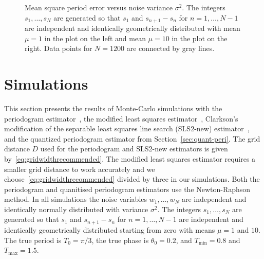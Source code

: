 \documentclass[10pt,twocolumn,twoside]{IEEEtran}
\begin{document}
\begin{figure*}[t]
  \caption{Mean square period error versus noise variance $\sigma^2$.  The integers $s_1,\dots,s_N$ are generated so that $s_1$ and $s_{n+1} - s_n$ for $n=1,\dots,N-1$ are independent and identically geometrically distributed with mean $\mu = 1$ in the plot on the left and mean $\mu=10$ in the plot on the right. Data points for $N=1200$ are connected by gray lines.}\label{plot:multipleN}
\end{figure*} 


\section{Simulations} \label{sec:simulations}

This section presents the results of Monte-Carlo simulations with the periodogram estimator~\cite{Haohuan2013435,Fogel1989_bit_synch_zero_crossings}, the modified least squares estimator~\cite{Clarkson2007,McKilliam2007,Quinn_sparse_noisy_SSP_2012}, Clarkson's modification of the separable least squares line search (SLS2-new) estimator~\cite{Clarkson2007,Sidiropoulos2005}, and the quantized periodogram estimator from Section~\ref{sec:quant-peri}.  The grid distance $D$ used for the periodogram and SLS2-new estimators is given by~\eqref{eq:gridwidthrecommended}.  The modified least squares estimator requires a smaller grid distance to work accurately and we choose~\eqref{eq:gridwidthrecommended} divided by three in our simulations.  %
Both the periodogram and quanitised periodogram estimators use the Newton-Raphson method.  In all simulations the noise variables $w_1,\dots,w_N$ are independent and identically normally distributed with variance $\sigma^2$.  The integers $s_1,\dots,s_N$ are generated so that $s_1$ and $s_{n+1} - s_n$ for $n=1,\dots,N-1$ are independent and identically geometrically distributed starting from zero with means $\mu=1$ and $10$.  The true period is $T_0 = \pi/3$, the true phase is $\theta_0 = 0.2$, and $T_{\text{min}} = 0.8$ and $T_{\text{max}} = 1.5$.
\end{document}
